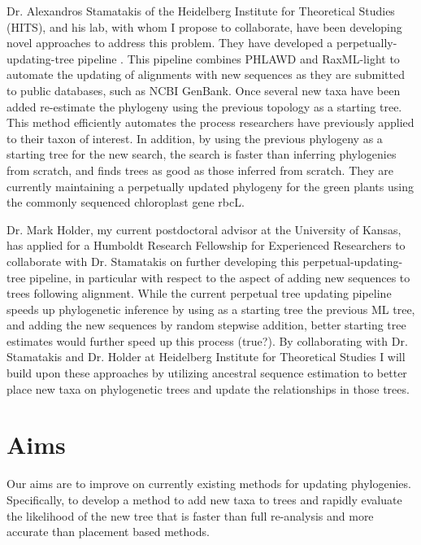\documentclass[10pt]{article}
\begin{document}
Dr. Alexandros Stamatakis of the Heidelberg Institute for Theoretical Studies (HITS), and his lab, with whom I propose to collaborate, have been developing novel approaches to address this problem. They have developed a perpetually-updating-tree pipeline \cite{izquierdo-carrasco_perpetual_????}. This pipeline combines PHLAWD \cite{smith_mega-phylogeny_2009} and RaxML-light \cite{stamatakis_RAxML-Light:_2012} to automate the updating of alignments with new sequences as they are submitted to public databases, such as NCBI GenBank. Once several new taxa have been added re-estimate the phylogeny using the previous topology as a starting tree. This method efficiently automates the process researchers have previously applied to their taxon of interest. In addition, by using the previous phylogeny as a starting tree for the new search, the search is faster than inferring phylogenies from scratch, and finds trees as good as those inferred from scratch. %
They  are currently maintaining a perpetually updated phylogeny for the green plants using the commonly sequenced chloroplast gene rbcL.

Dr. Mark Holder, my current postdoctoral advisor at the University of Kansas, has applied for a Humboldt Research Fellowship for Experienced Researchers to collaborate with Dr. Stamatakis on further developing this perpetual-updating-tree pipeline, in particular with respect to the aspect of adding new sequences to trees following alignment. While the current perpetual tree updating pipeline speeds up phylogenetic inference by using as a starting tree the previous ML tree, and adding the new sequences by random stepwise addition, better starting tree estimates would further speed up this process (true?).
By collaborating with Dr. Stamatakis and Dr. Holder at Heidelberg Institute for Theoretical Studies I will build upon these approaches by utilizing ancestral sequence estimation to better place new taxa on phylogenetic trees and update the relationships in those trees.


\section*{Aims}
Our aims are to improve on currently existing methods for updating phylogenies. Specifically, to develop a method to add new taxa to trees and rapidly evaluate the likelihood of the new tree that is faster than full re-analysis and more accurate than placement based methods. %
 
\end{document}

